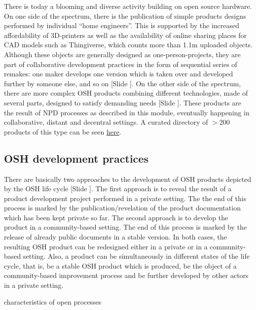 \documentclass{article}
\newcounter{slide}
\begin{document}
There is today a blooming and diverse activity building on open source hardware. On one side of the spectrum, there is the publication of simple products designs performed by individual ``home engineers''. This is supported by the increased affordability of 3D-printers as well as the availability of online sharing places for CAD models such as Thingiverse, which counts more than 1.1m uploaded objects. Although these objects are generally designed as one-person-projects, they are part of collaborative development practices in the form of sequential series of remakes: one maker develops one version which is taken over and developed further by someone else, and so on \cite{kyriakouKnowledgeReuseCustomization2017}{\color{blue}[Slide ]}. On the other side of the spectrum, there are more complex OSH products combining different technologies, made of several parts, designed to satisfy demanding needs {\color{blue}[Slide ]}. These products are the result of NPD processes as described in this module, eventually happening in collaborative, distant and decentral settings. A curated directory of $>$200 products of this type can be seen \href{http://opensourcedesign.cc/observatory}{here}.

\subsection{OSH development practices}
\label{sec:dvppractices}

There are basically two approaches to the development of OSH products depicted by the OSH life cycle {\color{blue}[Slide ]}. The first approach is to reveal the result of a product development project performed in a private setting. The the end of this process is marked by the publication/revelation of the product documentation which has been kept private so far. The second approach is to develop the product in a community-based setting. The end of this process is marked by the release of already public documents in a stable version. In both cases, the resulting OSH product can be redesigned either in a private or in a community-based setting. Also, a product can be simultaneously in different states of the life cycle, that is, be a stable OSH product which is produced, be the object of a community-based improvement process and be further developed by other actors in a private setting.

{\color{red}characteristics of open processes}
\end{document}
